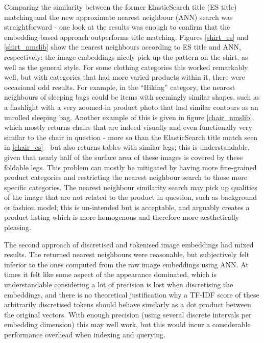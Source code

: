 Comparing the similarity between the former ElasticSearch title (ES title) matching and the new approximate nearest neighbour (ANN) search was straightforward - one look at the results was enough to confirm that the embedding-based approach outperforms title matching.
Figures \ref{shirt_es} and \ref{shirt_nmslib} show the nearest neighbours according to ES title and ANN, respectively; the image embeddings nicely pick up the pattern on the shirt, as well as the general style.
For some clothing categories this worked remarkably well, but with categories that had more varied products within it, there were occasional odd results.
For example, in the ``Hiking'' category, the nearest neighbours of sleeping bags could be items with seemingly similar shapes, such as a flashlight with a very zoomed-in product photo that had similar contours as an unrolled sleeping bag.
Another example of this is given in figure \ref{chair_nmslib}, which mostly returns chairs that are indeed visually and even functionally very similar to the chair in question - more so than the ElasticSearch title match seen in \ref{chair_es} - but also returns tables with similar legs; this is understandable, given that nearly half of the surface area of these images is covered by these foldable legs.
This problem can mostly be mitigated by having more fine-grained product categories and restricting the nearest neighbour search to those more specific categories.
The nearest neighbour similarity search may pick up qualities of the image that are not related to the product in question, such as background or fashion model; this is un-intended but is acceptable, and arguably creates a product listing which is more homogenous and therefore more aesthetically pleasing.

The second approach of discretised and tokenised image embeddings had mixed results.
The returned nearest neighbours were reasonable, but subjectively felt inferior to the ones computed from the raw image embeddings using ANN.
At times it felt like some aspect of the appearance dominated, which is understandable considering a lot of precision is lost when discretising the embeddings, and there is no theoretical justification why a TF-IDF score of these arbitrarily discretised tokens should behave similarly as a dot product between the original vectors.
With enough precision (using several discrete intervals per embedding dimension) this may well work, but this would incur a considerable performance overhead when indexing and querying.

